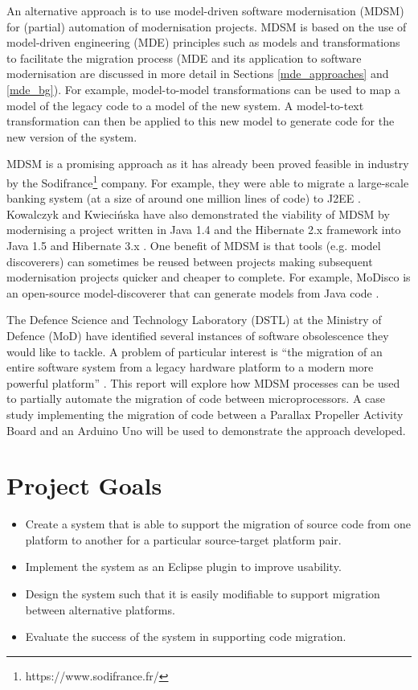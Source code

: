 \documentclass{UoYCSproject}
\begin{document}
An alternative approach is to use model-driven software modernisation (MDSM) for (partial) automation of modernisation projects. MDSM is based on the use of model-driven engineering (MDE) principles such as models and transformations to facilitate the migration process (MDE and its application to software modernisation are discussed in more detail in Sections \ref{mde_approaches} and \ref{mde_bg}). For example, model-to-model transformations can be used to map a model of the legacy code to a model of the new system. A model-to-text transformation can then be applied to this new model to generate code for the new version of the system.

MDSM is a promising approach as it has already been proved feasible in industry by the Sodifrance\footnote{https://www.sodifrance.fr/} company. For example, they were able to migrate a large-scale banking system (at a size of around one million lines of code) to J2EE \parencite{fleurey2007model}. Kowalczyk and Kwieci\'nska have also demonstrated the viability of MDSM by modernising a project written in Java 1.4 and the Hibernate 2.x framework into Java 1.5 and Hibernate 3.x \parencite{kowalczyk2009model}. One benefit of MDSM is that tools (e.g. model discoverers) can sometimes be reused between projects making subsequent modernisation projects quicker and cheaper to complete. For example, MoDisco is an open-source model-discoverer that can generate models from Java code \parencite{bruneliere2014modisco}.

The Defence Science and Technology Laboratory (DSTL) at the Ministry of Defence (MoD) have identified several instances of software obsolescence they would like to tackle. A problem of particular interest is ``the migration of an entire software system from a legacy hardware platform to a modern more powerful platform'' \parencite{gerasimou2017technical}. This report will explore how MDSM processes can be used to partially automate the migration of code between microprocessors. A case study implementing the migration of code between a Parallax Propeller Activity Board and an Arduino Uno will be used to demonstrate the approach developed.
 
\section{Project Goals}
\begin{itemize}
\item Create a system that is able to support the migration of source code from one platform to another for a particular source-target platform pair.
\item Implement the system as an Eclipse plugin to improve usability.
\item Design the system such that it is easily modifiable to support migration between alternative platforms.
\item Evaluate the success of the system in supporting code migration.
\end{itemize}
\end{document}
